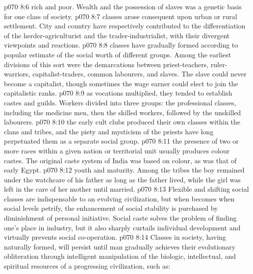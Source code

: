 \vs p070 8:6 \bibnobreakspace {} rich and poor. Wealth and the possession of slaves was a genetic basis for one class of society.
\vs p070 8:7 \bibnobreakspace {} classes arose consequent upon urban or rural settlement. City and country have respectively contributed to the differentiation of the herder\hyp{}agriculturist and the trader\hyp{}industrialist, with their divergent viewpoints and reactions.
\vs p070 8:8 \bibnobreakspace {} classes have gradually formed according to popular estimate of the social worth of different groups. Among the earliest divisions of this sort were the demarcations between priest\hyp{}teachers, ruler\hyp{}warriors, capitalist\hyp{}traders, common labourers, and slaves. The slave could never become a capitalist, though sometimes the wage earner could elect to join the capitalistic ranks.
\vs p070 8:9 \bibnobreakspace {} as vocations multiplied, they tended to establish castes and guilds. Workers divided into three groups: the professional classes, including the medicine men, then the skilled workers, followed by the unskilled labourers.
\vs p070 8:10 \bibnobreakspace {} the early cult clubs produced their own classes within the clans and tribes, and the piety and mysticism of the priests have long perpetuated them as a separate social group.
\vs p070 8:11 \bibnobreakspace {} the presence of two or more races within a given nation or territorial unit usually produces colour castes. The original caste system of India was based on colour, as was that of early Egypt.
\vs p070 8:12 \bibnobreakspace {} youth and maturity. Among the tribes the boy remained under the watchcare of his father as long as the father lived, while the girl was left in the care of her mother until married.
\vs p070 8:13 \pc Flexible and shifting social classes are indispensable to an evolving civilization, but when  becomes  when social levels petrify, the enhancement of social stability is purchased by diminishment of personal initiative. Social caste solves the problem of finding one’s place in industry, but it also sharply curtails individual development and virtually prevents social co\hyp{}operation.
\vs p070 8:14 Classes in society, having naturally formed, will persist until man gradually achieves their evolutionary obliteration through intelligent manipulation of the biologic, intellectual, and spiritual resources of a progressing civilization, such as:
